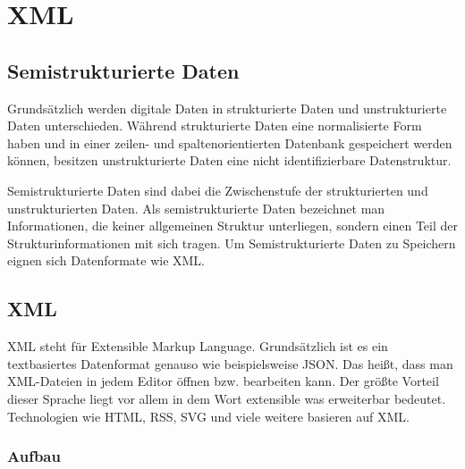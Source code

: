 \chapter{XML}\label{cha:xml}

\section{Semistrukturierte Daten}

Grundsätzlich werden digitale Daten in strukturierte Daten und unstrukturierte Daten unterschieden. Während strukturierte Daten eine normalisierte Form haben und in einer zeilen- und spaltenorientierten Datenbank gespeichert werden können, besitzen unstrukturierte Daten eine nicht identifizierbare Datenstruktur.

Semistrukturierte Daten sind dabei die Zwischenstufe der strukturierten und unstrukturierten Daten. Als semistrukturierte Daten bezeichnet man Informationen, die keiner allgemeinen Struktur unterliegen, sondern einen Teil der Strukturinformationen mit sich tragen. Um Semistrukturierte Daten zu Speichern eignen sich Datenformate wie XML.

\section{XML}

XML steht für Extensible Markup Language. Grundsätzlich ist es ein textbasiertes Datenformat genauso wie beispielsweise JSON. Das heißt, dass man XML-Dateien in jedem Editor öffnen bzw. bearbeiten kann. Der größte Vorteil dieser Sprache liegt vor allem in dem Wort extensible was erweiterbar bedeutet. Technologien wie HTML, RSS, SVG und viele weitere basieren auf XML.

\subsection{Aufbau}

